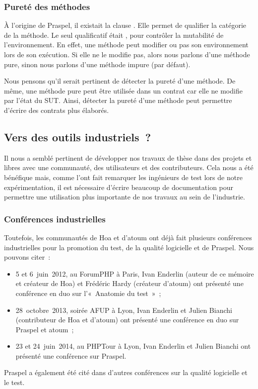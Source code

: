 \subsubsection{Pureté des méthodes}

À l'origine de Praspel, il existait la clause \ais. Elle permet de qualifier la
catégorie de la méthode. Le seul qualificatif était , pour contrôler
la mutabilité de l'environnement. En effet, une méthode peut modifier ou pas son
environnement lors de son exécution. Si elle ne le modifie pas, alors nous
parlons d'une méthode pure, sinon nous parlons d'une méthode impure (par
défaut).

Nous pensons qu'il serait pertinent de détecter la pureté d'une méthode. De
même, une méthode pure peut être utilisée dans un contrat car elle ne modifie
par l'état du SUT.  Ainsi, détecter la pureté d'une méthode peut permettre
d'écrire des contrats plus élaborés.

\subsection{Vers des outils industriels~?}

Il nous a semblé pertinent de développer nos travaux de thèse dans des projets
 et libres avec une communauté, des utilisateurs et des
contributeurs. Cela nous a été bénéfique mais, comme l'ont fait remarquer les
ingénieurs de test lors de notre expérimentation, il est nécessaire d'écrire
beaucoup de documentation pour permettre une utilisation plus importante de nos
travaux au sein de l'industrie.

\subsubsection{Conférences industrielles}

Toutefois, les communautés de Hoa et d'atoum ont déjà fait plusieurs conférences
industrielles pour la promotion du test, de la qualité logicielle et de Praspel.
Nous pouvons citer~:
%
\begin{itemize}

\item 5 et 6~juin~2012, au ForumPHP à Paris, Ivan Enderlin (auteur de ce mémoire
et créateur de Hoa) et Frédéric Hardy (créateur d'atoum) ont présenté une
conférence en duo sur l'«~Anatomie du test~»~;

\item 28~octobre~2013, soirée AFUP à Lyon, Ivan Enderlin et Julien Bianchi
(contributeur de Hoa et d'atoum) ont présenté une conférence en duo sur Praspel
et atoum~;

\item 23 et 24~juin~2014, au PHPTour à Lyon, Ivan Enderlin et Julien Bianchi ont
présenté une conférence sur Praspel.

\end{itemize}
%
Praspel a également été cité dans d'autres conférences sur la qualité logicielle
et le test.

